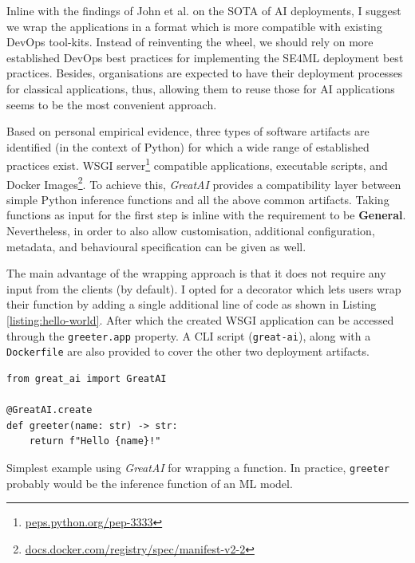 Inline with the findings of John et al. \cite{john2020architecting} on the SOTA of AI deployments, I suggest we wrap the applications in a format which is more compatible with existing DevOps tool-kits. Instead of reinventing the wheel, we should rely on more established DevOps best practices for implementing the SE4ML deployment best practices. Besides, organisations are expected to have their deployment processes for classical applications, thus, allowing them to reuse those for AI applications seems to be the most convenient approach.

Based on personal empirical evidence, three types of software artifacts are identified (in the context of Python) for which a wide range of established practices exist. WSGI server\footnote{\href{https://peps.python.org/pep-3333/}{peps.python.org/pep-3333}} compatible applications, executable scripts, and Docker Images\footnote{\href{https://docs.docker.com/registry/spec/manifest-v2-2/}{docs.docker.com/registry/spec/manifest-v2-2}}. To achieve this, \textit{GreatAI} provides a compatibility layer between simple Python inference functions and all the above common artifacts. Taking functions as input for the first step is inline with the requirement to be \textbf{General}. Nevertheless, in order to also allow customisation, additional configuration, metadata, and behavioural specification can be given as well.

The main advantage of the wrapping approach is that it does not require any input from the clients (by default). I opted for a decorator which lets users wrap their function by adding a single additional line of code as shown in Listing \ref{listing:hello-world}.  After which the created WSGI application can be accessed through the \texttt{greeter.app} property. A CLI script (\texttt{great-ai}), along with a \texttt{Dockerfile} are also provided to cover the other two deployment artifacts.

\begin{listing}[!ht]
\begin{verbatim}
from great_ai import GreatAI

@GreatAI.create
def greeter(name: str) -> str:
    return f"Hello {name}!"
\end{verbatim}
\caption{Simplest example using \textit{GreatAI} for wrapping a function. In practice, \texttt{greeter} probably would be the inference function of an ML model.}
\label{listing:hello-world}
\end{listing}

